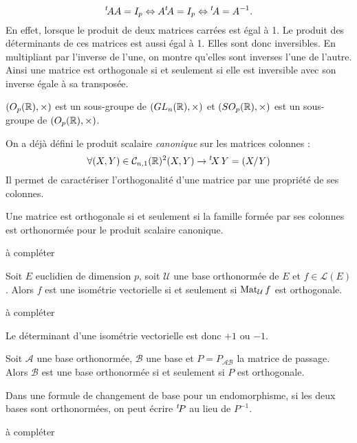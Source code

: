 \begin{rem}
\begin{displaymath}
  \mathstrut^t\! A A=I_p \Leftrightarrow A \mathstrut^t\! A = I_p \Leftrightarrow \mathstrut^t\! A = A^{-1}.
\end{displaymath}
En effet, lorsque le produit de deux matrices carrées est égal à 1. Le produit des déterminants de ces matrices est aussi égal à 1. Elles sont donc inversibles. En multipliant par l'inverse de l'une, on montre qu'elles sont inverses l'une de l'autre. Ainsi une matrice est orthogonale si et seulement si elle est inversible avec son inverse égale à sa transposée.
\end{rem}

\begin{propn}
 $(O_p(\mathbb{R}),\times)$ est un sous-groupe de $(GL_n(\mathbb{R}),\times)$ et $(SO_p(\mathbb{R}),\times)$ est un sous-groupe de $(O_p(\mathbb{R}),\times)$.
\end{propn}
On a déjà défini le produit scalaire \emph{canonique} sur les matrices colonnes :
\begin{displaymath}
\forall (X,Y) \in \mathcal C_{n,1}(\mathbb{R})^2  (X,Y) \rightarrow \mathstrut^t\! X\,Y =(X/Y)
\end{displaymath}
Il permet de caractériser l'orthogonalité d'une matrice par une propriété de ses colonnes.
\begin{propn}
 Une matrice est orthogonale si et seulement si la famille formée par ses colonnes est orthonormée pour le produit scalaire canonique.
\end{propn}
\begin{demo}
 à compléter
\end{demo}

\begin{propn}
 Soit $E$ euclidien de dimension $p$, soit $\mathcal U$ une base orthonormée de $E$ et $f\in \mathcal L(E)$. Alors $f$ est une isométrie vectorielle si et seulement si $\mathop{\mathrm{Mat}}_{\mathcal U}f$ est orthogonale.
\end{propn}
\begin{demo}
 à compléter
\end{demo}
\begin{rem}
  Le déterminant d'une isométrie vectorielle est donc $+1$ ou $-1$.
\end{rem}

\begin{propn}
  Soit $\mathcal{A}$ une base orthonormée, $\mathcal{B}$ une base et $P=P_{\mathcal{A} \mathcal{B}}$ la matrice de passage. Alors $\mathcal{B}$ est une base orthonormée si et seulement si $P$ est orthogonale. 
\end{propn}
\begin{rem}
  Dans une formule de changement de base pour un endomorphisme, si les deux bases sont orthonormées, on peut écrire $\mathstrut^t\! P$ au lieu de $P^{-1}$.
\end{rem}
\begin{demo}
 à compléter
\end{demo}


